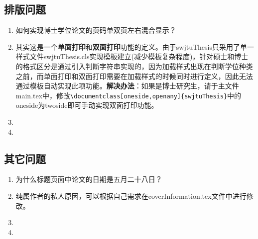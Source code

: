 \subsection{排版问题}
\begin{enumerate}
	\item[Q1:]如何实现博士学位论文的页码单双页左右混合显示？
	\item[A1:]其实这是一个\textbf{单面打印}和\textbf{双面打印}功能的定义。由于swjtuThesis只采用了单一样式文件swjtuThesis.cls实现模板建立(减少模板复杂程度)，针对硕士和博士的格式区分是通过引入判断字符串实现的，因为加载样式出现在判断学位种类之前，而单面打印和双面打印需要在加载样式的时候同时进行定义，因此无法通过模板自动实现此项功能。\textbf{解决办法}：如果是博士研究生，请于主文件main.tex中，修改\verb|\documentclass[oneside,openany]{swjtuThesis}|中的oneside为twoside即可手动实现双面打印功能。	
	\item[Q2:]
	\item[A2:]
\end{enumerate}

\subsection{其它问题}
\begin{enumerate}
	\item[Q1:]为什么标题页面中论文的日期是五月二十八日？
	\item[A1:]纯属作者的私人原因，可以根据自己需求在coverInformation.tex文件中进行修改。
	\item[Q2:]
	\item[A2:]
\end{enumerate}